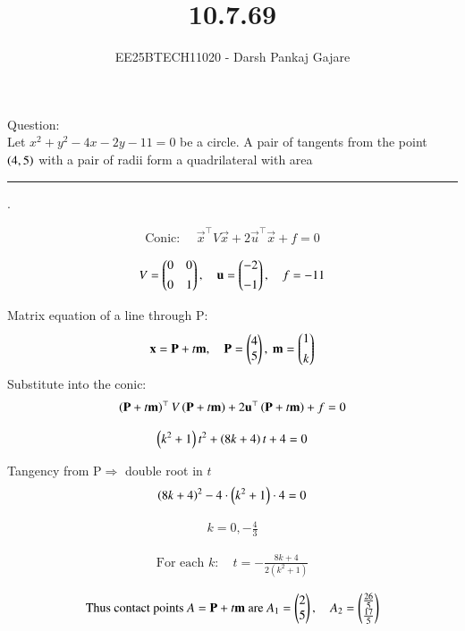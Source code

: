 \documentclass[journal,12pt,onecolumn]{IEEEtran}
\begin{document}
\title{10.7.69}
\author{EE25BTECH11020 - Darsh Pankaj Gajare}
{\let\newpage\relax\maketitle}

Question:\\

Let $x^2+y^2-4x-2y-11=0$ be a circle. A pair of tangents from the point $\left(4,5\right)$ with a pair of radii form a quadrilateral with area\rule{1cm}{0.4pt}.


\solution
\begin{align}
\text{Conic: }\quad \vec{x}^\top V\vec{x}+2\vec{u}^\top\vec{x}+f=0
\end{align}

\begin{align}
V=\begin{pmatrix}0 & 0\\[4pt]0 & 1\end{pmatrix},\quad \mathbf{u}=\begin{pmatrix}-2\\[4pt]-1\end{pmatrix},\quad f=-11
\end{align}

Matrix equation of a line through P: 
\begin{align}
\vec{x}=\vec{P}+t\vec{m},\quad \vec{P}=\myvec{4\\5},\ \vec{m}=\myvec{1\\[4pt]k}
\end{align}
Substitute into the conic:
\begin{align}
	\left(\mathbf{P}+t\mathbf{m}\right)^\top V\left(\mathbf{P}+t\mathbf{m}\right)+2\mathbf{u}^\top\left(\mathbf{P}+t\mathbf{m}\right)+f=0
\end{align}

\begin{align}
	\left(k^2+1\right)t^2+\left(8k+4\right)t+4=0
\end{align}

Tangency from P$\Rightarrow$ double root in $t$
\begin{align}
	\left(8k+4\right)^2-4\cdot\left(k^2+1\right)\cdot 4=0
\end{align}

\begin{align}
 k=0,-\frac{4}{3}
\end{align}

\begin{align}
\text{For each }k:\quad t=-\frac{8k+4}{2(k^2+1)}
\end{align}

\begin{align}
\text{Thus contact points }A=\mathbf{P}+t\mathbf{m}\text{ are }
A_1=\begin{pmatrix}2\\5\end{pmatrix},\quad A_2=\begin{pmatrix}\frac{26}{5}\\\frac{17}{5}\end{pmatrix}
\end{align}
\end{document}

